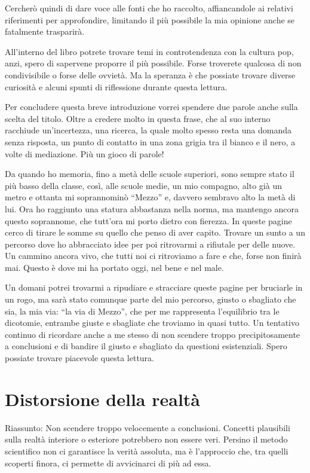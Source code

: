 \documentclass[12pt]{book} %
\begin{document}
Cercherò quindi di dare voce alle fonti che ho raccolto, affiancandole ai relativi riferimenti per approfondire,
limitando il più possibile la mia opinione anche se fatalmente trasparirà.

All'interno del libro potrete trovare temi in controtendenza con la cultura pop, anzi, spero di
sapervene proporre il più possibile. Forse troverete qualcosa di non condivisibile o forse delle ovvietà. Ma la
speranza è che possiate trovare diverse curiosità e alcuni spunti di riflessione durante questa lettura.

Per concludere questa breve introduzione vorrei spendere due parole anche sulla scelta del titolo. Oltre a credere molto
in questa frase, che al suo interno racchiude un'incertezza, una ricerca, la quale molto spesso
resta una domanda senza risposta, un punto di contatto in una zona grigia tra il bianco e il nero, a volte di
mediazione. Più un gioco di parole!

Da quando ho memoria, fino a metà delle scuole superiori, sono sempre stato il più basso della classe, così, alle scuole
medie, un mio compagno, alto già un metro e ottanta mi soprannominò “Mezzo” e, davvero sembravo alto la metà di lui.
Ora ho raggiunto una statura abbastanza nella norma, ma mantengo ancora questo soprannome, che
tutt'ora mi porto dietro con fierezza. In queste pagine cerco di tirare le somme su quello che
penso di aver capito. Trovare un sunto a un percorso dove ho abbracciato idee per poi ritrovarmi a rifiutale per delle
nuove. Un cammino ancora vivo, che tutti noi ci ritroviamo a fare e che, forse non finirà mai. Questo è dove mi ha portato oggi, nel bene e nel male.

Un domani potrei trovarmi a ripudiare e stracciare queste pagine per bruciarle in un rogo, ma sarà stato comunque parte
del mio percorso, giusto o sbagliato che sia, la mia via: “la via di Mezzo”, che per me rappresenta l'equilibrio tra le dicotomie, entrambe giuste e sbagliate che troviamo in quasi tutto. Un tentativo continuo di ricordare anche a me stesso di non scendere troppo precipitosamente a conclusioni e di bandire il giusto e sbagliato da questioni esistenziali.
Spero possiate trovare piacevole questa lettura.

\clearpage\section{Distorsione della realtà}
\begin{mdframed}[linewidth=1pt]
Riassunto: Non scendere troppo velocemente a conclusioni. Concetti plausibili sulla realtà interiore o esteriore potrebbero non essere veri. Persino il metodo scientifico non ci garantisce la verità assoluta, ma è l'approccio che, tra quelli scoperti finora, ci permette di avvicinarci di più ad essa.
\end{mdframed}
\end{document}
